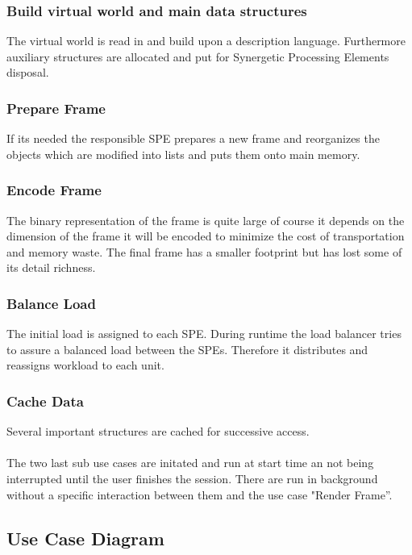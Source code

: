 \documentclass[DIV10, abstracton, openright, footsepline, headsepline, twoside, 9pt,
bigheadings]{scrreprt}
\begin{document}
\subsubsection*{Build virtual world and main data structures}
The virtual world is read in and build upon a description language. Furthermore
auxiliary structures are allocated and put for Synergetic Processing Elements
 disposal.

\subsubsection*{Prepare Frame }
If its needed the responsible SPE prepares a new frame and reorganizes the objects
which are modified into lists and puts them onto main memory.

\subsubsection*{Encode Frame}
The binary representation of the frame is quite large of course it
depends on the dimension of the frame it will be encoded to minimize the cost of
transportation and memory waste. The final frame has a smaller footprint but has
lost some of its detail richness.

\subsubsection*{Balance Load}
The initial load is assigned to each SPE. During runtime the load balancer tries
to assure a balanced load between the SPEs. Therefore it distributes and reassigns
workload to each unit.

\subsubsection*{Cache Data}
Several important structures are cached for successive access.\\\\

The two last sub use cases are initated and run at start time an not being interrupted
until the user finishes the session. There are run in background without a specific
interaction between them and the use case "Render Frame''.

\subsection{Use Case Diagram}
\end{document}
